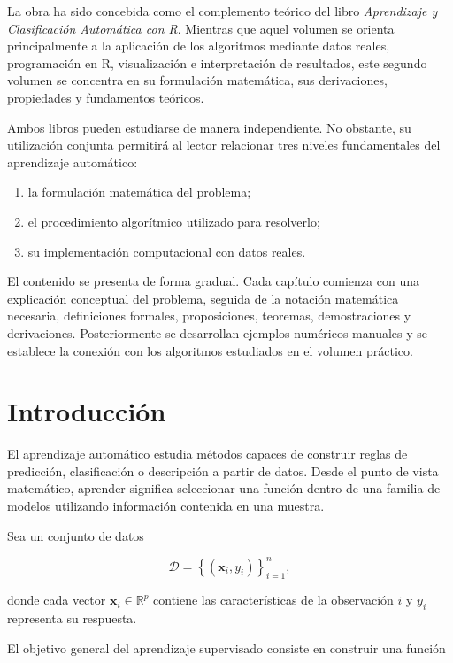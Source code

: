 \documentclass[
  spanish,
  11pt,
  letterpaper,
  DIV=11,
  numbers=noendperiod]{scrreprt}
\providecommand{\tightlist}{%
  \setlength{\itemsep}{0pt}\setlength{\parskip}{0pt}}
\theoremstyle{definition}
\theoremstyle{plain}
\theoremstyle{definition}
\theoremstyle{remark}
\begin{document}
La obra ha sido concebida como el complemento teórico del libro
\emph{Aprendizaje y Clasificación Automática con R}. Mientras que aquel
volumen se orienta principalmente a la aplicación de los algoritmos
mediante datos reales, programación en R, visualización e interpretación
de resultados, este segundo volumen se concentra en su formulación
matemática, sus derivaciones, propiedades y fundamentos teóricos.

Ambos libros pueden estudiarse de manera independiente. No obstante, su
utilización conjunta permitirá al lector relacionar tres niveles
fundamentales del aprendizaje automático:

\begin{enumerate}
\def\labelenumi{\arabic{enumi}.}
\tightlist
\item
  la formulación matemática del problema;
\item
  el procedimiento algorítmico utilizado para resolverlo;
\item
  su implementación computacional con datos reales.
\end{enumerate}

El contenido se presenta de forma gradual. Cada capítulo comienza con
una explicación conceptual del problema, seguida de la notación
matemática necesaria, definiciones formales, proposiciones, teoremas,
demostraciones y derivaciones. Posteriormente se desarrollan ejemplos
numéricos manuales y se establece la conexión con los algoritmos
estudiados en el volumen práctico.


\chapter{Introducción}\label{introducciuxf3n}

El aprendizaje automático estudia métodos capaces de construir reglas de
predicción, clasificación o descripción a partir de datos. Desde el
punto de vista matemático, aprender significa seleccionar una función
dentro de una familia de modelos utilizando información contenida en una
muestra.

Sea un conjunto de datos

\[
\mathcal{D}
=
\left\{
(\mathbf{x}_i,y_i)
\right\}_{i=1}^{n},
\]

donde cada vector \(\mathbf{x}_i\in\mathbb{R}^{p}\) contiene las
características de la observación \(i\) y \(y_i\) representa su
respuesta.

El objetivo general del aprendizaje supervisado consiste en construir
una función
\end{document}
